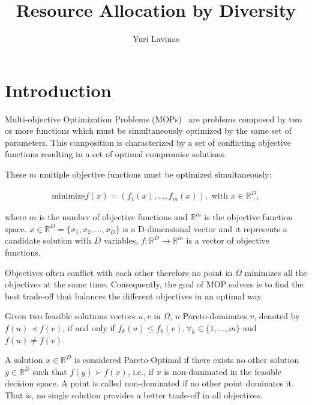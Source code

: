 \documentclass{IEEEtran}
\begin{document}
\title{Resource Allocation by Diversity}
\author{Yuri Lavinas}

\maketitle






\section{Introduction}

Multi-objective Optimization Problems (MOPs)~\cite{miettinen1999nonlinear} are problems composed by two or more functions which must be simultaneously optimized by the same set of parameters. This composition is characterized by a set of conflicting objective functions resulting in a set of optimal compromise solutions. 

These $m$ multiple objective functions must be optimized simultaneously:

\begin{align}\label{min_problem}
\text{minimize} f(x) = (f_1(x), ..., f_{m}(x)), \text{ with $x \in \mathbb{R}^{D}$},
\end{align}

where $m$ is the number of objective functions and $\mathbb{R}^m$ is the objective function space. $x \in \mathbb{R}^{D} = \{x_1, x_2, ..., x_D\}$ is a D-dimensional vector and it represents a candidate solution with ${D}$ variables, $f: \mathbb{R}^{D} \rightarrow \mathbb{R}^{m}$ is a vector of objective functions.%

Objectives often conflict with each other therefore no point in $\Omega$ minimizes all the objectives at the same time. Consequently, the goal of MOP solvers is to find the best trade-off that balances the different objectives in an optimal way.

Given two feasible solutions vectors $u, v$ in $\Omega$, $u$  Pareto-dominates $v$, denoted by $f(u) \prec f(v)$, if and only if $f_k(u) \leq f_k(v), \forall_k \in \{1,..., m\}$ and $ f(u) \neq f(v)$. 

A solution $x \in \mathbb{R}^{D}$ is considered Pareto-Optimal if there exists no other solution $y \in \mathbb{R}^{D}$ such that $f(y) \succ f(x)$, i.e., if $x$ is non-dominated in the feasible decision space. A point is called non-dominated if no other point dominates it. That is, no single solution provides a better trade-off in all objectives.
\end{document}
